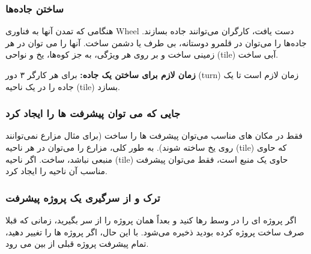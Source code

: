 \documentclass[]{article}
\begin{document}
\subsubsection*{{\titr ساختن جاده‌ها}}
هنگامی که تمدن آنها به فناوری Wheel دست یافت، کارگران می‌توانند جاده بسازند.
جاده‌ها را می‌توان در قلمرو دوستانه، بی طرف یا دشمن ساخت. آنها را می توان در هر زمینی ساخت و بر روی هر ویژگی، به جز کوه‌ها، یخ و نواحی (tile) آبی ساخت.

\noindent \textbf{زمان لازم برای ساختن یک جاده:} 
برای  هر کارگر ۳ دور (turn) زمان لازم است تا یک جاده را در یک ناحیه (tile) بسازد.

\subsubsection*{{\titr جایی که می توان پیشرفت ها را ایجاد کرد}}
فقط در مکان های مناسب می‌توان پیشرفت ها را ساخت (برای مثال مزارع نمی‌توانند روی یخ ساخته شوند).
به طور کلی، مزارع را می‌توان در هر ناحیه (tile) که حاوی منبعی نباشد، ساخت. اگر ناحیه (tile) حاوی یک منبع است، فقط می‌توان پیشرفت مناسب آن ناحیه را ایجاد کرد.

\subsubsection*{{\titr ترک و از سرگیری یک پروژه پیشرفت}}
اگر پروژه ای را در وسط رها کنید و بعداً همان پروژه را از سر بگیرید، زمانی که قبلا صرف ساخت پروژه کرده بودید ذخیره می‌شود. با این حال، اگر پروژه ها را تغییر دهید، تمام پیشرفت پروژه قبلی از بین می رود.
\end{document}
